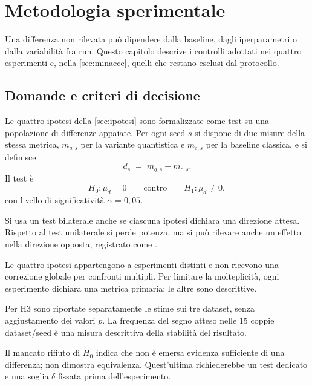 \chapter{Metodologia sperimentale}
\label{cap:metodologia}

Una differenza non rilevata può dipendere dalla baseline, dagli iperparametri o
dalla variabilità fra run. Questo capitolo descrive i controlli adottati nei
quattro esperimenti e, nella \cref{sec:minacce}, quelli che restano esclusi dal
protocollo.

\section{Domande e criteri di decisione}
\label{sec:falsificazione}

Le quattro ipotesi della \cref{sec:ipotesi} sono formalizzate come test su una
popolazione di differenze appaiate. Per ogni seed $s$ si dispone di due misure
della stessa metrica, $m_{q,s}$ per la variante quantistica e $m_{c,s}$ per la
baseline classica, e si definisce
\begin{equation}
  d_s \;=\; m_{q,s} - m_{c,s}.
  \label{eq:differenza-appaiata}
\end{equation}
Il test è
\begin{equation}
  H_0 : \mu_d = 0
  \qquad\text{contro}\qquad
  H_1 : \mu_d \neq 0 ,
  \label{eq:test}
\end{equation}
con livello di significatività $\alpha = 0{,}05$.

Si usa un test bilaterale anche se ciascuna ipotesi dichiara una direzione attesa.
Rispetto al test unilaterale si perde potenza, ma si può rilevare anche un effetto
nella direzione opposta, registrato come \evidenzacontraria{}.

Le quattro ipotesi appartengono a esperimenti distinti e non ricevono una
correzione globale per confronti multipli. Per limitare la molteplicità, ogni
esperimento dichiara una metrica primaria; le altre sono descrittive.

Per H3 sono riportate separatamente le stime sui tre dataset, senza aggiustamento
dei valori $p$. La frequenza del segno atteso nelle 15 coppie dataset/seed è una
misura descrittiva della stabilità del risultato.

Il mancato rifiuto di $H_0$ indica che non è emersa evidenza sufficiente di una
differenza; non dimostra equivalenza. Quest'ultima richiederebbe un test dedicato
e una soglia $\delta$ fissata prima dell'esperimento.


